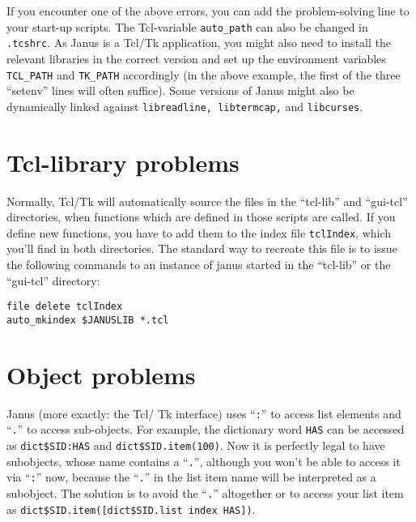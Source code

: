 If    you encounter one    of the   above  errors,   you can   add the
problem-solving   line to your  start-up   scripts.   The Tcl-variable
\texttt{auto\_path} can also be changed  in \texttt{.tcshrc}. As Janus
is a Tcl/Tk application,  you might also need  to install the relevant
libraries in the correct version and set  up the environment variables
\texttt{TCL\_PATH} and  \texttt{TK\_PATH}  accordingly (in  the  above
example,  the  first   of  the three    ``setenv''   lines will  often
suffice).  Some versions  of Janus  might also   be dynamically linked
against \texttt{libreadline, libtermcap,} and \texttt{libcurses}.


\section{Tcl-library problems} \label{trouble:tcllib}

Normally,   Tcl/Tk   will  automatically  source   the   files  in the
``tcl-lib'' and   ``gui-tcl'' directories,  when  functions  which are
defined in those scripts are called. If  you define new functions, you
have to  add them to  the index  file  \texttt{tclIndex}, which you'll
find in both directories. The standard way to recreate this file is to
issue  the following commands to an  instance of  janus started in the
``tcl-lib'' or the ``gui-tcl'' directory:

\begin{verbatim}
file delete tclIndex
auto_mkindex $JANUSLIB *.tcl
\end{verbatim}



\section{Object problems} \label{trouble:dbase}

Janus (more  exactly:  the Tcl/  Tk interface) uses  ``\texttt{:}'' to
access list elements  and  ``\texttt{.}'' to access  sub-objects.  For
example,  the dictionary  word    \texttt{HAS}  can be   accessed   as
\texttt{dict\$SID:HAS}    and \texttt{dict\$SID.item(100)}.  Now it is
perfectly   legal  to  have    subobjects,   whose name    contains  a
``\texttt{.}'',  although you  won't   be  able  to  access    it  via
``\texttt{:}'' now, because the ``\texttt{.}''   in the list item name
will be  interpreted  as a subobject.   The  solution is to avoid  the
``\texttt{.}''   altogether  or  to   access   your  list  item     as
\texttt{dict\$SID.item([dict\$SID.list index HAS])}.


